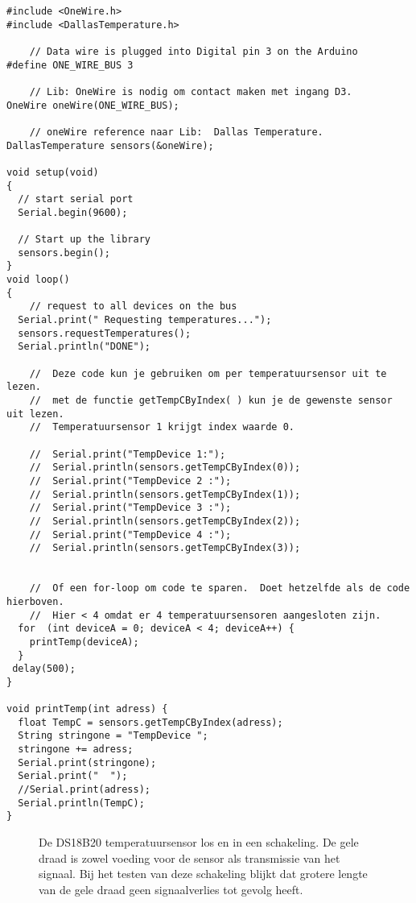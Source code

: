 \begin{verbatim}
#include <OneWire.h>
#include <DallasTemperature.h>
 
    // Data wire is plugged into Digital pin 3 on the Arduino
#define ONE_WIRE_BUS 3
 
    // Lib: OneWire is nodig om contact maken met ingang D3. 
OneWire oneWire(ONE_WIRE_BUS);
 
    // oneWire reference naar Lib:  Dallas Temperature.
DallasTemperature sensors(&oneWire);
 
void setup(void)
{
  // start serial port
  Serial.begin(9600);
  
  // Start up the library
  sensors.begin();  
}
void loop()
{ 
    // request to all devices on the bus
  Serial.print(" Requesting temperatures...");
  sensors.requestTemperatures(); 
  Serial.println("DONE");
  
    //  Deze code kun je gebruiken om per temperatuursensor uit te lezen.
    //  met de functie getTempCByIndex( ) kun je de gewenste sensor uit lezen.
    //  Temperatuursensor 1 krijgt index waarde 0.    

    //  Serial.print("TempDevice 1:");
    //  Serial.println(sensors.getTempCByIndex(0)); 
    //  Serial.print("TempDevice 2 :");
    //  Serial.println(sensors.getTempCByIndex(1));
    //  Serial.print("TempDevice 3 :");
    //  Serial.println(sensors.getTempCByIndex(2));
    //  Serial.print("TempDevice 4 :");
    //  Serial.println(sensors.getTempCByIndex(3));  


    //  Of een for-loop om code te sparen.  Doet hetzelfde als de code hierboven. 
    //  Hier < 4 omdat er 4 temperatuursensoren aangesloten zijn.
  for  (int deviceA = 0; deviceA < 4; deviceA++) {
    printTemp(deviceA);
  }
 delay(500);
}

void printTemp(int adress) {  
  float TempC = sensors.getTempCByIndex(adress);
  String stringone = "TempDevice ";
  stringone += adress;
  Serial.print(stringone);
  Serial.print("  ");
  //Serial.print(adress);
  Serial.println(TempC);  
}
\end{verbatim}


\begin{figure}
    \centering
    \subfloat[]{
        \texttt{[image: DS18B20]}
        \label{fig:DS18B20}}
    \hfill
    \caption{De DS18B20 temperatuursensor los en in een schakeling. De gele draad 
    is zowel voeding voor de sensor als transmissie van het signaal.
    Bij het testen van deze schakeling blijkt dat grotere lengte van de gele draad 
    geen signaalverlies tot gevolg heeft.}
\end{figure}

